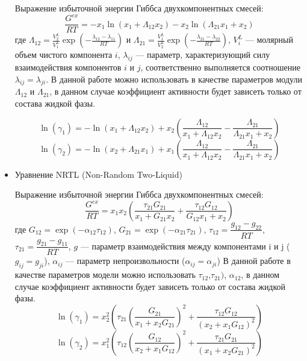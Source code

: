 \begin{itemize}
	Выражение избыточной энергии Гиббса двухкомпонентных смесей:
	\begin{equation}
	\frac{G^{ex}}{RT}=-x_1 \ln(x_1+\Lambda_{12} x_2)-x_2 \ln(\Lambda_{21} x_1 +x_2)
	\end{equation}
	где $\Lambda_{12}=\frac{V_2^L}{V_1^L}\exp\left(-\frac{\lambda_{12}-\lambda_{11}}{RT} \right)$ и $\Lambda_{21}=\frac{V_1^L}{V_2^L}\exp\left(-\frac{\lambda_{21}-\lambda_{22}}{RT}\right)$,  $V_i^L$ --- молярный объем чистого компонента $i$, $\lambda_{ij}$ --- параметр, характеризующий силу взаимодействия компонентов $i$ и $j$, соответственно выполняется соотношение $\lambda_{ij}=\lambda_{ji}$. В данной работе можно использовать в качестве параметров модули $\Lambda_{12}$ и $\Lambda_{21}$, в данном случае коэффициент активности будет зависеть только от состава жидкой фазы.
	
	\begin{equation}
	\ln(\gamma_1)=-\ln(x_1 + \Lambda_{12} x_2) + x_2 \left( \dfrac{\Lambda_{12}}{x_1 + \Lambda_{12} x_2 } - \dfrac{\Lambda_{21}}{\Lambda_{21} x_1+x_2} \right)
	\end{equation}
	\begin{equation}
	\ln(\gamma_2)=-\ln(x_2 + \Lambda_{21} x_1) + x_1 \left( \dfrac{\Lambda_{12}}{x_1 + \Lambda_{12} x_2 } - \dfrac{\Lambda_{21}}{\Lambda_{21} x_1+x_2} \right)
	\end{equation} 
	
	\item Уравнение NRTL (Non-Random Two-Liquid)
	
	Выражение избыточной энергии Гиббса двухкомпонентных смесей:
	\begin{equation}
	\dfrac{G^{ex}}{RT}=x_1 x_2 \left( \dfrac{\tau_{21}G_{21}}{x_1 + G_{21} x_2} + \dfrac{\tau_{12} G_{12}}{G_{12} x_1 +x_2} \right)
	\end{equation}
	где $G_{12}=\exp(-\alpha_{12} \tau_{12})$,  $G_{21}=\exp(-\alpha_{21} \tau_{21})$, $\tau_{12}=\dfrac{g_{12}-g_{22}}{RT}$, $\tau_{21}=\dfrac{g_{21}-g_{11}}{RT}$, $g$ --- параметр взаимодействия между компонентами i и j ($g_{ij}=g_{ji}$), $\alpha_{ij}$ --- параметр непроизвольности ($\alpha_{ij}=\alpha_{ji}$)
	В данной работе в качестве параметров модели можно использовать $\tau_{12}$,$\tau_{21})$, $\alpha_{12}$, в данном случае коэффициент активности будет зависеть только от состава жидкой фазы.
	\begin{equation}
	\ln(\gamma_1)=x^2_2 \left( \tau_{21} \left(\dfrac{G_{21}}{x_1+x_2 G_{21}}\right)^2 + \dfrac{\tau_{12} G_{12}}{(x_2+x_1 G_{12})^2} \right)
	\end{equation}
	\begin{equation}
	\ln(\gamma_2)=x^2_1 \left( \tau_{12} \left(\dfrac{G_{12}}{x_2+x_1 G_{12}}\right)^2 + \dfrac{\tau_{21} G_{21}}{(x_1+x_2 G_{21})^2} \right)
	\end{equation} 
\end{itemize}

